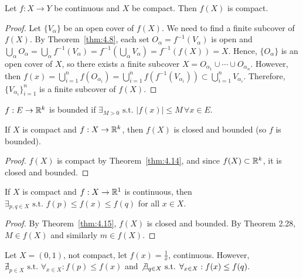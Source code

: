 \begin{theorem}[14]
	Let $f: X\to Y$ be continuous and $X$ be compact. Then $f(X)$ is compact.
	\begin{proof}
		Let $\{ V_{\alpha} \}$ be an open cover of $f(X)$.
		We need to find a finite subcover of $f(X)$.
		By Theorem~\ref{thm:4.8}, each set $O_{\alpha}=f^{-1}(V_{\alpha})$ is open and $\bigcup_{\alpha} O_{\alpha}=\bigcup_{\alpha} f^{-1}(V_{\alpha})=f^{-1}(\bigcup_{\alpha}V_{\alpha})=f^{-1}(f(X))=X$. Hence, $\{O_{\alpha}\} $ is an open cover of $X$, so there exists a finite subcover $X=O_{\alpha_1} \cup \cdots \cup O_{\alpha_n}$.
		However, then $f(x)=\bigcup_{i=1}^{n}f(O_{\alpha_{i}})= \bigcup_{i=1}^{n}f(f^{-1}(V_{\alpha_{i}})) \subset \bigcup_{i=1}^{n}V_{\alpha_i}$. Therefore, $\{V_{\alpha_{i}}\}^{n}_{i=1}$ is a finite subcover of $f(X)$.
	\end{proof}
\end{theorem}
\begin{definition}[4.13]
	\label{def:4.13}
	$f: E \to \mathbb{R}^{k}$ is bounded if $\exists_{M>0} \text{ s.t. } |f(x)|\le M\, \forall x \in E$.
\end{definition}

\begin{theorem}[15]
	If $X$ is compact and $f:X\to \mathbb{R}^{k}$, then $f(X)$ is closed and bounded (so $f$ is bounded).
	\begin{proof}
		$f(X)$ is compact by Theorem~\ref{thm:4.14}, and since $f(X) \subset \mathbb{R}^{k}$, it is closed and bounded.
	\end{proof}
\end{theorem}

\begin{thm}[16]
	If $X$ is compact and $f:X\to \mathbb{R}^{1}$ is continuous, then $\exists_{p,q \in X}\text{ s.t. } f(p)\le f(x)\le f(q)$ for all $x \in X$.
	\begin{proof}
		By Theorem~\ref{thm:4.15}, $f(X)$ is closed and bounded.
		By Theorem 2.28, $M \in f(X)$ and similarly $m \in f(X)$.
	\end{proof}
\end{thm}
\begin{example}
	Let $X=(0,1)$, not compact, let $f(x)=\frac{1}{x}$, continuous. However, $\nexists_{p \in X} \text{ s.t. } \forall_{x \in X}:  f(p)\le f(x)$ and $\not \exists_{q \in X} \text{ s.t. } \forall_{x \in X}:  f(x)\le f(q)$.
\end{example}


